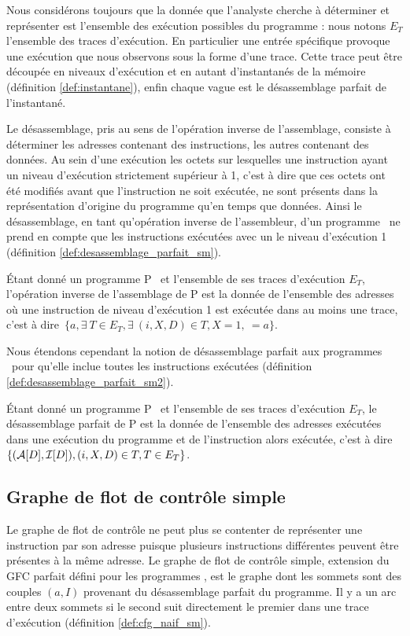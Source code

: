 Nous considérons toujours que la donnée que l'analyste cherche à déterminer et représenter est l'ensemble des exécution possibles du programme : nous notons $E_T$ l'ensemble des traces d'exécution.
En particulier une entrée spécifique provoque une exécution que nous observons sous la forme d'une trace.
Cette trace peut être découpée en niveaux d'exécution et en autant d'instantanés de la mémoire (définition \ref{def:instantane}), enfin chaque vague est le désassemblage parfait de l'instantané.

Le désassemblage, pris au sens de l'opération inverse de l'assemblage,
consiste à déterminer les adresses contenant des instructions, les
autres contenant des données.
Au sein d'une exécution les octets sur lesquelles une instruction ayant
un niveau d'exécution strictement supérieur à 1, c'est à dire que ces
octets ont été modifiés avant que l'instruction ne soit exécutée, ne
sont présents dans la représentation d'origine du programme qu'en temps
que données.
Ainsi le désassemblage, en tant qu'opération inverse de l'assembleur, d'un programme \sm\ ne prend en compte
que les instructions exécutées avec un le niveau d'exécution 1
(définition \ref{def:desassemblage_parfait_sm}).

\begin{defi}
 Étant donné un programme P \sm\ et l'ensemble de ses traces d'exécution
$E_T$, l'opération inverse de l'assemblage de P est la donnée de l'ensemble des adresses où une
instruction de niveau d'exécution 1 est exécutée dans au moins une
trace, c'est à dire~$\{a, \exists\ T\in E_T, \exists\ (i, X, D)\in T, X=1,\ $$=a\}$.
\label{def:desassemblage_parfait_sm}
\end{defi}

Nous étendons cependant la notion de désassemblage parfait aux programmes \sms\ pour qu'elle inclue toutes les instructions exécutées (définition \ref{def:desassemblage_parfait_sm2}).

\begin{defi}
 Étant donné un programme P \sm\ et l'ensemble de ses traces d'exécution
$E_T$, le désassemblage parfait de P est la donnée de l'ensemble des adresses exécutées dans une exécution du programme et de l'instruction alors exécutée, c'est à dire~$\{(\mathcal A[D], \mathcal I[D]), (i, X, D)\in T, T\in E_T\}$.
\label{def:desassemblage_parfait_sm2}
\end{defi}

\subsection{Graphe de flot de contrôle simple}
Le graphe de flot de contrôle ne peut plus se contenter de représenter
une instruction par son adresse puisque plusieurs instructions
différentes peuvent être présentes à la même adresse.
Le graphe de flot de contrôle simple, extension du GFC parfait défini pour les programmes \nsms, est le graphe dont les sommets sont des couples $(a, I)$ provenant du désassemblage parfait du programme. Il y a un arc entre deux sommets si le second suit directement le premier dans une trace d'exécution (définition \ref{def:cfg_naif_sm}).

